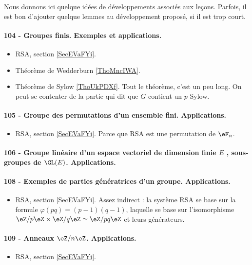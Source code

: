 Nous donnons ici quelque idées de développements associés aux leçons. Parfois, il est bon d'ajouter quelque lemmes au développement proposé, si il est trop court.


\paragraph{104 - Groupes finis. Exemples et applications.}
\begin{itemize}
    \item RSA, section \ref{SecEVaFYi}.
    \item Théorème de Wedderburn \ref{ThoMncIWA}.
    \item Théorème de Sylow \ref{ThoUkPDXf}. Tout le théorème, c'est un peu long. On peut se contenter de la partie qui dit que \( G\) contient un \( p\)-Sylow.
\end{itemize}
\paragraph{105 - Groupe des permutations d’un ensemble fini. Applications.}
\begin{itemize}
    \item RSA, section \ref{SecEVaFYi}. Parce que RSA est une permutation de \( \eF_n\).
\end{itemize}
\paragraph{106 - Groupe linéaire d’un espace vectoriel de dimension finie $E$ , sous-groupes de $\GL(E)$. Applications.}
\paragraph{108 - Exemples de parties génératrices d’un groupe. Applications.}
\begin{itemize}
    \item RSA, section \ref{SecEVaFYi}. Assez indirect : la système RSA se base sur la formule \( \varphi(pq)=(p-1)(q-1)\), laquelle se base sur l'isomorphisme \( \eZ/p\eZ\times \eZ/q\eZ\simeq \eZ/pq\eZ\) et leurs générateurs.
\end{itemize}
\paragraph{109 - Anneaux $\eZ/n\eZ$. Applications.}
\begin{itemize}
    \item RSA, section \ref{SecEVaFYi}.
\end{itemize}

